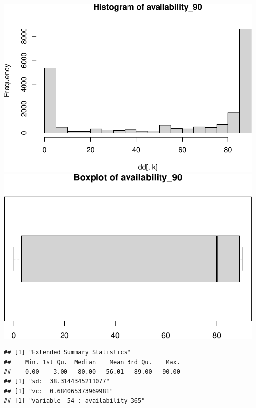 \includegraphics{anal_files/figure-latex/unnamed-chunk-7-36.pdf}
\includegraphics{anal_files/figure-latex/unnamed-chunk-7-37.pdf}

\begin{verbatim}
## [1] "Extended Summary Statistics"
##    Min. 1st Qu.  Median    Mean 3rd Qu.    Max. 
##    0.00    3.00   80.00   56.01   89.00   90.00 
## [1] "sd:  38.3144345211077"
## [1] "vc:  0.684065373969981"
## [1] "variable  54 : availability_365"
\end{verbatim}

